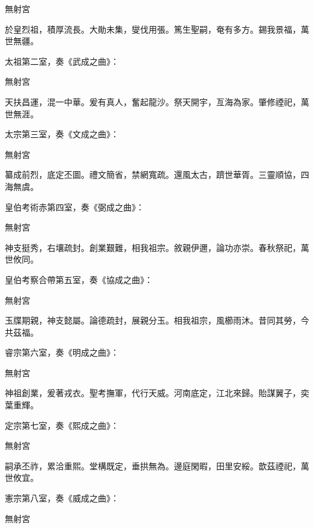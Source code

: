 \begin{pinyinscope}
 無射宮



 於皇烈祖，積厚流長。大勛未集，燮伐用張。篤生聖嗣，奄有多方。錫我景福，萬世無疆。



 太祖第二室，奏《武成之曲》：



 無射宮



 天扶昌運，混一中華。爰有真人，奮起龍沙。祭天開宇，亙海為家。肇修禋祀，萬世無涯。



 太宗第三室，奏《文成之曲》：



 無射宮



 纂成前烈，底定丕圖。禮文簡省，禁網寬疏。還風太古，躋世華胥。三靈順協，四海無虞。



 皇伯考術赤第四室，奏《弼成之曲》：



 無射宮



 神支挺秀，右壤疏封。創業艱難，相我祖宗。敘親伊邇，論功亦崇。春秋祭祀，萬世攸同。



 皇伯考察合帶第五室，奏《協成之曲》：



 無射宮



 玉牒期親，神支懿屬。論德疏封，展親分玉。相我祖宗，風櫛雨沐。昔同其勞，今共茲福。



 睿宗第六室，奏《明成之曲》：



 無射宮



 神祖創業，爰著戎衣。聖考撫軍，代行天威。河南底定，江北來歸。貽謀翼子，奕葉重輝。



 定宗第七室，奏《熙成之曲》：



 無射宮



 嗣承丕祚，累洽重熙。堂構既定，垂拱無為。邊庭閑暇，田里安綏。歆茲禋祀，萬世攸宜。



 憲宗第八室，奏《威成之曲》：



 無射宮




\end{pinyinscope}
